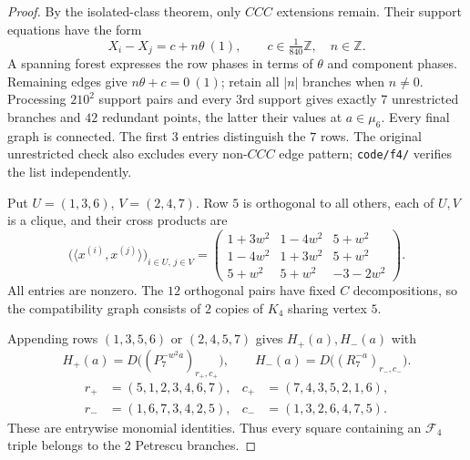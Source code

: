 \documentclass[11pt,a4paper]{article}
\theoremstyle{plain}
\theoremstyle{definition}
\numberwithin{equation}{section}
\begin{document}
\begin{proof}
By the isolated-class theorem, only $CCC$ extensions remain. Their support equations have the form
$$
X_i-X_j=c+n\theta\ (1),\qquad c\in\tfrac1{840}\mathbb Z,
\quad n\in\mathbb Z.
$$
A spanning forest expresses the row phases in terms of $\theta$ and component phases. Remaining edges give $n\theta+c=0\ (1)$; retain all $|n|$ branches when $n\ne0$. Processing $210^2$ support pairs and every $3$rd support gives exactly $7$ unrestricted branches and $42$ redundant points, the latter their values at $a\in\mu_6$. Every final graph is connected. The first $3$ entries distinguish the $7$ rows. The original unrestricted check also excludes every non-$CCC$ edge pattern; \texttt{code/f4/} verifies the list independently.

Put $U=(1,3,6)$, $V=(2,4,7)$. Row $5$ is orthogonal to all others, each of $U,V$ is a clique, and their cross products are
$$
\bigl(\langle x^{(i)},x^{(j)}\rangle\bigr)_{i\in U,\,j\in V}
=
\begin{pmatrix}
1+3w^2&1-4w^2&5+w^2\\
1-4w^2&1+3w^2&5+w^2\\
5+w^2&5+w^2&-3-2w^2
\end{pmatrix}.
$$
All entries are nonzero. The $12$ orthogonal pairs have fixed $C$ decompositions, so the compatibility graph consists of $2$ copies of $K_4$ sharing vertex $5$.

Appending rows $(1,3,5,6)$ or $(2,4,5,7)$ gives $H_+(a),H_-(a)$ with
$$
\boxed{\quad H_+(a)=D\bigl((P_7^{-w^2a})_{r_+,c_+}\bigr),
\qquad H_-(a)=D\bigl((R_7^{-a})_{r_-,c_-}\bigr).\quad}
$$
$$
\begin{aligned}
r_+&=(5,1,2,3,4,6,7),&c_+&=(7,4,3,5,2,1,6),\\
r_-&=(1,6,7,3,4,2,5),&c_-&=(1,3,2,6,4,7,5).
\end{aligned}
$$
These are entrywise monomial identities. Thus every square containing an $\mathcal F_4$ triple belongs to the $2$ Petrescu branches.
\end{proof}
\end{document}
